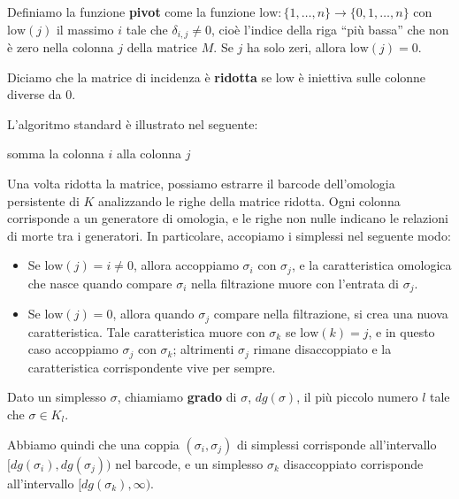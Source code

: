 \documentclass[a4paper, 12pt]{article}
\theoremstyle{definition}
\theoremstyle{remark}
\begin{document}
Definiamo la funzione \textbf{pivot} come la funzione $\text{low} : \{1, \dots, n\} \to \{0, 1, \dots, n\}$ con $\text{low}(j)$ il massimo $i$ tale che $\delta_{i,j} \neq 0$, cioè l'indice della riga ``più bassa'' che non è zero nella colonna $j$ della matrice $M$. Se $j$ ha solo zeri, allora $\text{low}(j) = 0$.

Diciamo che la matrice di incidenza è \textbf{ridotta} se $\text{low}$ è iniettiva sulle colonne diverse da $0$.

L'algoritmo standard è illustrato nel seguente:

\begin{algorithm}[H]
    \caption{Algoritmo standard di riduzione di una matrice di incidenza}
\begin{algorithmic}
\State somma la colonna $i$ alla colonna $j$
\EndWhile
\EndFor
\end{algorithmic}
\label{algo: standard}
\end{algorithm}

Una volta ridotta la matrice, possiamo estrarre il barcode dell'omologia persistente di $K$ analizzando le righe della matrice ridotta. Ogni colonna corrisponde a un generatore di omologia, e le righe non nulle indicano le relazioni di morte tra i generatori. In particolare, accopiamo i simplessi nel seguente modo:
\begin{itemize}
    \item Se $\text{low}(j) = i \neq 0$, allora accoppiamo $\sigma_i$ con $\sigma_j$, e la caratteristica omologica che nasce quando compare $\sigma_i$ nella filtrazione muore con l'entrata di $\sigma_j$.
    \item Se $\text{low}(j) = 0$, allora quando $\sigma_j$ compare nella filtrazione, si crea una nuova caratteristica. Tale caratteristica muore con $\sigma_k$ se $\text{low}(k) = j$, e in questo caso accoppiamo $\sigma_j$ con $\sigma_k$; altrimenti $\sigma_j$ rimane disaccoppiato e la caratteristica corrispondente vive per sempre.
\end{itemize}

Dato un simplesso $\sigma$, chiamiamo \textbf{grado} di $\sigma$, $dg(\sigma)$, il più piccolo numero $l$ tale che $\sigma \in K_l$.

Abbiamo quindi che una coppia $(\sigma_i, \sigma_j)$ di simplessi corrisponde all'intervallo $[dg(\sigma_i), dg(\sigma_j))$ nel barcode, e un simplesso $\sigma_k$ disaccoppiato corrisponde all'intervallo $[dg(\sigma_k), \infty)$.
\end{document}
